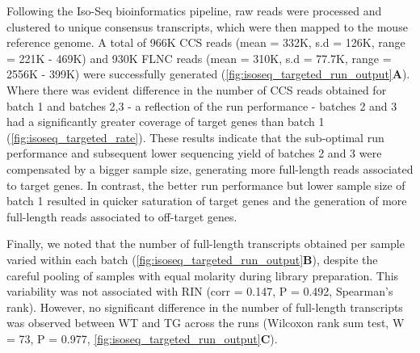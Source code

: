 Following the Iso-Seq bioinformatics pipeline, raw reads were processed and clustered to unique consensus transcripts, which were then mapped to the mouse reference genome. A total of 966K CCS reads (mean = 332K, s.d = 126K, range =  221K - 469K) and 930K FLNC reads (mean = 310K, s.d = 77.7K, range = 2556K - 399K) were successfully generated (\cref{fig:isoseq_targeted_run_output}\textbf{A}). Where there was evident difference in the number of CCS reads obtained for batch 1 and batches 2,3 - a reflection of the run performance - batches 2 and 3 had a significantly greater coverage of target genes than batch 1 (\cref{fig:isoseq_targeted_rate}). These results indicate that the sub-optimal run performance and subsequent lower sequencing yield of batches 2 and 3 were compensated by a bigger sample size, generating more full-length reads associated to target genes. In contrast, the better run performance but lower sample size of batch 1 resulted in quicker saturation of target genes and the generation of more full-length reads associated to off-target genes. 

Finally, we noted that the number of full-length transcripts obtained per sample varied within each batch (\cref{fig:isoseq_targeted_run_output}\textbf{B}), despite the careful pooling of samples with equal molarity during library preparation. This variability was not associated with RIN (corr = 0.147, P = 0.492, Spearman's rank). However, no significant difference in the number of full-length transcripts was observed between WT and TG across the runs (Wilcoxon rank sum test, W = 73, P = 0.977, \cref{fig:isoseq_targeted_run_output}\textbf{C}). 


